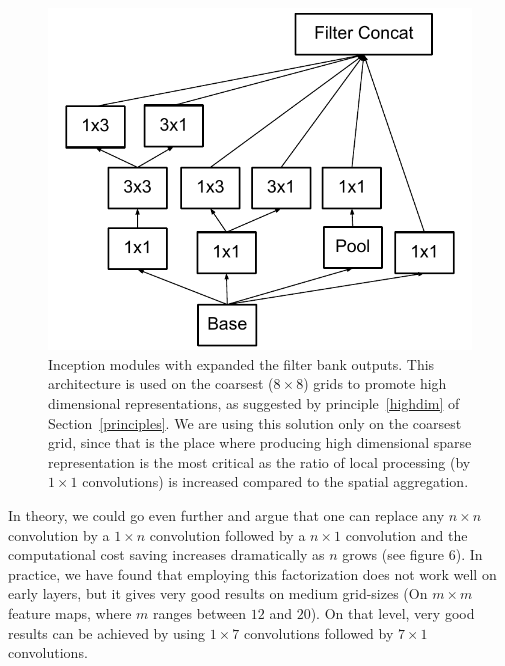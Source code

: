 \begin{figure}
\centering
\includegraphics[width=\linewidth]{inceptionv4}
\caption{Inception modules with expanded the filter bank outputs. This
  architecture is used on the coarsest ($8\times 8$) grids to promote
high dimensional representations, as suggested by principle~\ref{highdim} of Section~\ref{principles}.
We are using this solution only on the coarsest grid, since that is the place
where producing high dimensional sparse representation is the most critical
as the ratio of local processing (by $1\times 1$ convolutions) is increased
compared to the spatial aggregation.}
\label{fig:inceptionv4}
\end{figure}

In theory, we could go even further and argue that one can
replace any $n\times n$ convolution by a $1\times n$ convolution followed
by a $n\times 1$ convolution and the computational cost saving increases
dramatically as $n$ grows (see figure 6). In practice, we have found that employing this
factorization does not work well on early layers, but it gives very good results
on medium grid-sizes (On $m\times m$ feature maps, where $m$ ranges between $12$
and $20$). On that level, very good results can be achieved by using
$1\times 7$ convolutions followed by $7\times 1$ convolutions.
